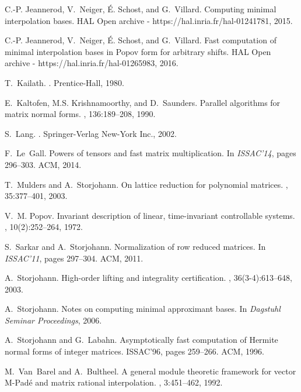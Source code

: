 \documentclass[preprint]{sig-alternate-05-2015}
\begin{document}
{
C.-P. Jeannerod, V.~Neiger, \'E. Schost, and G.~Villard.
\newblock Computing minimal interpolation bases.
\newblock HAL Open archive - https://hal.inria.fr/hal-01241781, 2015.

C.-P. Jeannerod, V.~Neiger, \'E. Schost, and G.~Villard.
\newblock Fast computation of minimal interpolation bases in {Popov} form for
  arbitrary shifts.
\newblock HAL Open archive - https://hal.inria.fr/hal-01265983, 2016.

T.~Kailath.
.
\newblock Prentice-Hall, 1980.

E.~Kaltofen, M.S. Krishnamoorthy, and D.~Saunders.
\newblock Parallel algorithms for matrix normal forms.
, 136:189--208, 1990.

S.~Lang.
.
\newblock Springer-Verlag New-York Inc., 2002.

F.~Le~Gall.
\newblock Powers of tensors and fast matrix multiplication.
\newblock In {\em ISSAC'14}, pages 296--303. ACM, 2014.

T.~Mulders and A.~Storjohann.
\newblock On lattice reduction for polynomial matrices.
, 35:377--401, 2003.

V.~M. Popov.
\newblock Invariant description of linear, time-invariant controllable systems.
, 10(2):252--264, 1972.

S.~Sarkar and A.~Storjohann.
\newblock Normalization of row reduced matrices.
\newblock In {\em ISSAC'11}, pages 297--304. ACM, 2011.

A.~Storjohann.
\newblock High-order lifting and integrality certification.
, 36(3-4):613--648, 2003.

A.~Storjohann.
\newblock Notes on computing minimal approximant bases.
\newblock In {\em Dagstuhl Seminar Proceedings}, 2006.

A.~Storjohann and G.~Labahn.
\newblock Asymptotically fast computation of {H}ermite normal forms of integer
  matrices.
\newblock ISSAC'96, pages 259--266. ACM, 1996.

M.~Van~Barel and A.~Bultheel.
\newblock A general module theoretic framework for vector {M-Pad\'e} and matrix
  rational interpolation.
, 3:451--462, 1992.

}
\end{document}
